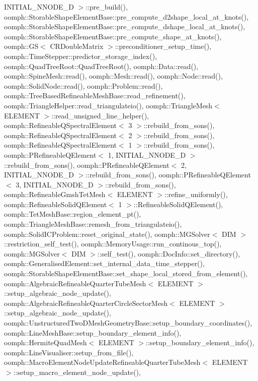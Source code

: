 I\+N\+I\+T\+I\+A\+L\+\_\+\+N\+N\+O\+D\+E\+\_\+D $>$\+::pre\+\_\+build(), oomph\+::\+Storable\+Shape\+Element\+Base\+::pre\+\_\+compute\+\_\+d2shape\+\_\+local\+\_\+at\+\_\+knots(), oomph\+::\+Storable\+Shape\+Element\+Base\+::pre\+\_\+compute\+\_\+dshape\+\_\+local\+\_\+at\+\_\+knots(), oomph\+::\+Storable\+Shape\+Element\+Base\+::pre\+\_\+compute\+\_\+shape\+\_\+at\+\_\+knots(), oomph\+::\+G\+S$<$ C\+R\+Double\+Matrix $>$\+::preconditioner\+\_\+setup\+\_\+time(), oomph\+::\+Time\+Stepper\+::predictor\+\_\+storage\+\_\+index(), oomph\+::\+Quad\+Tree\+Root\+::\+Quad\+Tree\+Root(), oomph\+::\+Data\+::read(), oomph\+::\+Spine\+Mesh\+::read(), oomph\+::\+Mesh\+::read(), oomph\+::\+Node\+::read(), oomph\+::\+Solid\+Node\+::read(), oomph\+::\+Problem\+::read(), oomph\+::\+Tree\+Based\+Refineable\+Mesh\+Base\+::read\+\_\+refinement(), oomph\+::\+Triangle\+Helper\+::read\+\_\+triangulateio(), oomph\+::\+Triangle\+Mesh$<$ E\+L\+E\+M\+E\+N\+T $>$\+::read\+\_\+unsigned\+\_\+line\+\_\+helper(), oomph\+::\+Refineable\+Q\+Spectral\+Element$<$ 3 $>$\+::rebuild\+\_\+from\+\_\+sons(), oomph\+::\+Refineable\+Q\+Spectral\+Element$<$ 2 $>$\+::rebuild\+\_\+from\+\_\+sons(), oomph\+::\+Refineable\+Q\+Spectral\+Element$<$ 1 $>$\+::rebuild\+\_\+from\+\_\+sons(), oomph\+::\+P\+Refineable\+Q\+Element$<$ 1, I\+N\+I\+T\+I\+A\+L\+\_\+\+N\+N\+O\+D\+E\+\_\+D $>$\+::rebuild\+\_\+from\+\_\+sons(), oomph\+::\+P\+Refineable\+Q\+Element$<$ 2, I\+N\+I\+T\+I\+A\+L\+\_\+\+N\+N\+O\+D\+E\+\_\+D $>$\+::rebuild\+\_\+from\+\_\+sons(), oomph\+::\+P\+Refineable\+Q\+Element$<$ 3, I\+N\+I\+T\+I\+A\+L\+\_\+\+N\+N\+O\+D\+E\+\_\+D $>$\+::rebuild\+\_\+from\+\_\+sons(), oomph\+::\+Refineable\+Gmsh\+Tet\+Mesh$<$ E\+L\+E\+M\+E\+N\+T $>$\+::refine\+\_\+uniformly(), oomph\+::\+Refineable\+Solid\+Q\+Element$<$ 1 $>$\+::\+Refineable\+Solid\+Q\+Element(), oomph\+::\+Tet\+Mesh\+Base\+::region\+\_\+element\+\_\+pt(), oomph\+::\+Triangle\+Mesh\+Base\+::remesh\+\_\+from\+\_\+triangulateio(), oomph\+::\+Solid\+I\+C\+Problem\+::reset\+\_\+original\+\_\+state(), oomph\+::\+M\+G\+Solver$<$ D\+I\+M $>$\+::restriction\+\_\+self\+\_\+test(), oomph\+::\+Memory\+Usage\+::run\+\_\+continous\+\_\+top(), oomph\+::\+M\+G\+Solver$<$ D\+I\+M $>$\+::self\+\_\+test(), oomph\+::\+Doc\+Info\+::set\+\_\+directory(), oomph\+::\+Generalised\+Element\+::set\+\_\+internal\+\_\+data\+\_\+time\+\_\+stepper(), oomph\+::\+Storable\+Shape\+Element\+Base\+::set\+\_\+shape\+\_\+local\+\_\+stored\+\_\+from\+\_\+element(), oomph\+::\+Algebraic\+Refineable\+Quarter\+Tube\+Mesh$<$ E\+L\+E\+M\+E\+N\+T $>$\+::setup\+\_\+algebraic\+\_\+node\+\_\+update(), oomph\+::\+Algebraic\+Refineable\+Quarter\+Circle\+Sector\+Mesh$<$ E\+L\+E\+M\+E\+N\+T $>$\+::setup\+\_\+algebraic\+\_\+node\+\_\+update(), oomph\+::\+Unstructured\+Two\+D\+Mesh\+Geometry\+Base\+::setup\+\_\+boundary\+\_\+coordinates(), oomph\+::\+Line\+Mesh\+Base\+::setup\+\_\+boundary\+\_\+element\+\_\+info(), oomph\+::\+Hermite\+Quad\+Mesh$<$ E\+L\+E\+M\+E\+N\+T $>$\+::setup\+\_\+boundary\+\_\+element\+\_\+info(), oomph\+::\+Line\+Visualiser\+::setup\+\_\+from\+\_\+file(), oomph\+::\+Macro\+Element\+Node\+Update\+Refineable\+Quarter\+Tube\+Mesh$<$ E\+L\+E\+M\+E\+N\+T $>$\+::setup\+\_\+macro\+\_\+element\+\_\+node\+\_\+update(), 